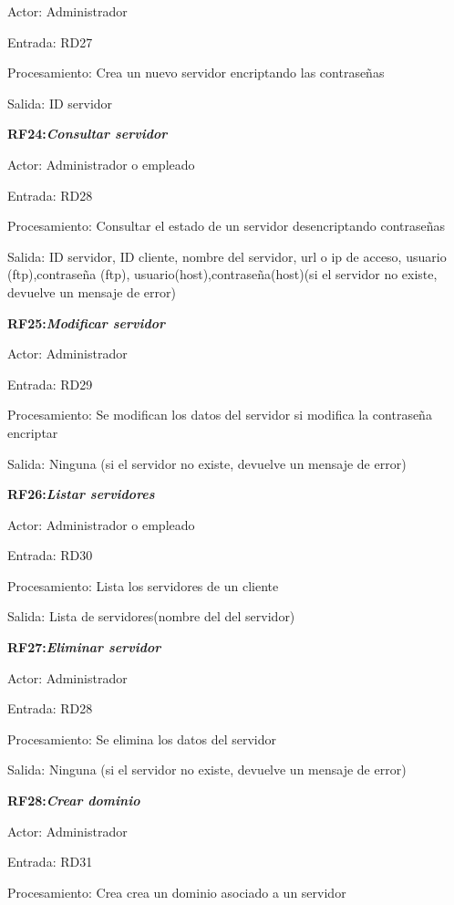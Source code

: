 \documentclass[paper=a4, fontsize=11pt, spanish]{scrartcl}
\begin{document}
Actor: Administrador

Entrada: RD27

Procesamiento: Crea un nuevo servidor encriptando las contraseñas

Salida: ID servidor

\setlength{\parindent}{0em}
\textbf{RF24:\textit{Consultar servidor}}
\setlength{\parindent}{3em}

Actor: Administrador o empleado

Entrada: RD28

Procesamiento: Consultar el estado de un servidor desencriptando contraseñas

Salida: ID servidor, ID cliente, nombre del servidor, url o ip de acceso, usuario (ftp),contraseña (ftp), usuario(host),contraseña(host)(si el servidor no existe, devuelve un mensaje de error)

\setlength{\parindent}{0em}
\textbf{RF25:\textit{Modificar servidor}}
\setlength{\parindent}{3em}

Actor: Administrador

Entrada: RD29

Procesamiento: Se modifican los datos del servidor si modifica la contraseña encriptar

Salida: Ninguna (si el servidor no existe, devuelve un mensaje de error)

\setlength{\parindent}{0em}
\textbf{RF26:\textit{Listar servidores}}
\setlength{\parindent}{3em}

Actor: Administrador o empleado

Entrada: RD30

Procesamiento: Lista los servidores de un cliente

Salida: Lista de servidores(nombre del del servidor)

\setlength{\parindent}{0em}
\textbf{RF27:\textit{Eliminar servidor}}
\setlength{\parindent}{3em}

Actor: Administrador

Entrada: RD28

Procesamiento: Se elimina los datos del servidor

Salida: Ninguna  (si el servidor no existe, devuelve un mensaje de error)

\setlength{\parindent}{0em}
\textbf{RF28:\textit{Crear dominio}}
\setlength{\parindent}{3em}

Actor: Administrador

Entrada: RD31

Procesamiento: Crea crea un dominio asociado a un servidor
\end{document}
